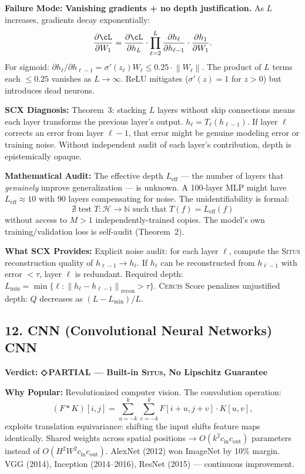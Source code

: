 \documentclass[12pt,a4paper]{article}
\theoremstyle{definition}
\newcommand{\weakness}{{\color{weakcolor}\textbf{◇\,PARTIAL}}}
\newcommand{\Situs}{\textsc{Situs}}
\newcommand{\Cercis}{\textsc{Cercis}}
\newcommand{\N}{\mathbb{N}}
\newcommand{\cH}{\mathcal{H}}
\newcommand{\norm}[1]{\left\lVert#1\right\rVert}
\newcommand{\auditHeader}[1]{\medskip\noindent\textbf{\large #1}\medskip}
\newcommand{\whyPopular}{\noindent\textbf{Why Popular:} }
\newcommand{\whyFail}{\noindent\textbf{Failure Mode:} }
\newcommand{\whatMissing}{\noindent\textbf{What SCX Provides:} }
\newcommand{\diagnosis}{\noindent\textbf{SCX Diagnosis:} }
\newcommand{\mathAudit}{\noindent\textbf{Mathematical Audit:} }
\begin{document}
\whyFail{} \textbf{Vanishing gradients + no depth justification.} As $L$ increases, gradients decay exponentially:
\[
\frac{\partial \cL}{\partial W_1} = \frac{\partial \cL}{\partial h_L} \cdot \prod_{\ell=2}^L \frac{\partial h_\ell}{\partial h_{\ell-1}} \cdot \frac{\partial h_1}{\partial W_1}.
\]
For sigmoid: $\partial h_\ell / \partial h_{\ell-1} = \sigma'(z_\ell) W_\ell \le 0.25 \cdot \norm{W_\ell}$. The product of $L$ terms each $\le 0.25$ vanishes as $L \to \infty$. ReLU mitigates ($\sigma'(z) = 1$ for $z > 0$) but introduces dead neurons.

\diagnosis{} Theorem~3: stacking $L$ layers without skip connections means each layer transforms the previous layer's output. $h_\ell = T_\ell(h_{\ell-1})$. If layer $\ell$ corrects an error from layer $\ell-1$, that error might be genuine modeling error or training noise. Without independent audit of each layer's contribution, depth is epistemically opaque.

\mathAudit{} The effective depth $L_{\text{eff}}$ — the number of layers that \textit{genuinely} improve generalization — is unknown. A 100-layer MLP might have $L_{\text{eff}} \approx 10$ with 90 layers compensating for noise. The unidentifiability is formal:
\[
\nexists \; \text{test} \; T: \cH \to \N \text{ such that } T(f) = L_{\text{eff}}(f)
\]
without access to $M>1$ independently-trained copies. The model's own training/validation loss is self-audit (Theorem~2).

\whatMissing{} Explicit noise audit: for each layer $\ell$, compute the \Situs{} reconstruction quality of $h_{\ell-1} \to h_\ell$. If $h_\ell$ can be reconstructed from $h_{\ell-1}$ with error $< \tau$, layer $\ell$ is redundant. Required depth: $L_{\min} = \min\{\ell : \norm{h_\ell - h_{\ell-1}}_{\text{recon}} > \tau\}$. \Cercis{} Score penalizes unjustified depth: $Q$ decreases as $(L - L_{\min}) / L$.

\subsection{12. CNN (Convolutional Neural Networks) CNN}

\auditHeader{Verdict: \weakness{} — Built-in \Situs{}, No Lipschitz Guarantee}

\whyPopular{} Revolutionized computer vision. The convolution operation:
\[
(F * K)[i, j] = \sum_{u=-k}^k \sum_{v=-k}^k F[i+u, j+v] \cdot K[u, v],
\]
exploits translation equivariance: shifting the input shifts feature maps identically. Shared weights across spatial positions → $O(k^2 c_{\text{in}} c_{\text{out}})$ parameters instead of $O(H^2 W^2 c_{\text{in}} c_{\text{out}})$. AlexNet (2012) won ImageNet by 10\% margin. VGG (2014), Inception (2014--2016), ResNet (2015) — continuous improvement.
\end{document}
